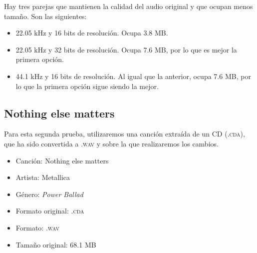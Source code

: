 \documentclass[11pt,a4paper]{article}
\begin{document}
Hay tres parejas que mantienen la calidad del audio original y que ocupan menos tamaño. Son las siguientes:

\begin{itemize}
	\item 22.05 kHz y 16 bits de resolución. Ocupa 3.8 MB.
	\item 22.05 kHz y 32 bits de resolución. Ocupa 7.6 MB, por lo que es mejor la primera opción.
	\item 44.1 kHz y 16 bits de resolución. Al igual que la anterior, ocupa 7.6 MB, por lo que la primera opción sigue siendo la mejor.
\end{itemize}

\subsection{Nothing else matters}

Para esta segunda prueba, utilizaremos una canción extraída de un CD (\textsc{.cda}), que ha sido convertida a \textsc{.wav} y sobre la que realizaremos los cambios.

\begin{itemize}
	\item Canción: Nothing else matters
	\item Artista: Metallica
	\item Género: \textit{Power Ballad}
	\item Formato  original: \textsc{.cda}
	\item Formato: \textsc{.wav}
	\item Tamaño original: 68.1 MB
\end{itemize}
\end{document}
